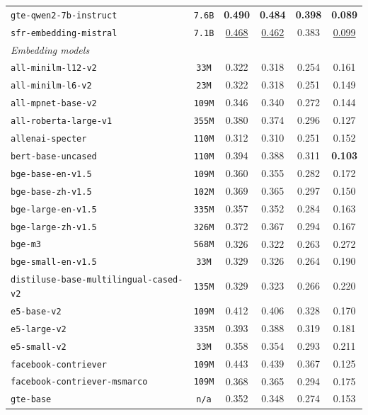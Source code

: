 \documentclass{article}
\begin{document}
\begin{table}[h!]
{\begin{tabular}{lccccc}
\texttt{gte-qwen2-7b-instruct} & \texttt{7.6B} & \textbf{0.490} & \textbf{0.484} & \textbf{0.398} & \textbf{0.089} \\
\texttt{sfr-embedding-mistral} & \texttt{7.1B} & \underline{0.468} & \underline{0.462} & 0.383 & \underline{0.099} \\
\midrule
\multicolumn{6}{l}{\textit{Embedding models}} \\
\midrule
\texttt{all-minilm-l12-v2} & \texttt{33M} & 0.322 & 0.318 & 0.254 & 0.161 \\
\texttt{all-minilm-l6-v2} & \texttt{23M} & 0.322 & 0.318 & 0.251 & 0.149 \\
\texttt{all-mpnet-base-v2} & \texttt{109M} & 0.346 & 0.340 & 0.272 & 0.144 \\
\texttt{all-roberta-large-v1} & \texttt{355M} & 0.380 & 0.374 & 0.296 & 0.127 \\
\texttt{allenai-specter} & \texttt{110M} & 0.312 & 0.310 & 0.251 & 0.152 \\
\texttt{bert-base-uncased} & \texttt{110M} & 0.394 & 0.388 & 0.311 & \textbf{0.103} \\
\texttt{bge-base-en-v1.5} & \texttt{109M} & 0.360 & 0.355 & 0.282 & 0.172 \\
\texttt{bge-base-zh-v1.5} & \texttt{102M} & 0.369 & 0.365 & 0.297 & 0.150 \\
\texttt{bge-large-en-v1.5} & \texttt{335M} & 0.357 & 0.352 & 0.284 & 0.163 \\
\texttt{bge-large-zh-v1.5} & \texttt{326M} & 0.372 & 0.367 & 0.294 & 0.167 \\
\texttt{bge-m3} & \texttt{568M} & 0.326 & 0.322 & 0.263 & 0.272 \\
\texttt{bge-small-en-v1.5} & \texttt{33M} & 0.329 & 0.326 & 0.264 & 0.190 \\
\texttt{distiluse-base-multilingual-cased-v2} & \texttt{135M} & 0.329 & 0.323 & 0.266 & 0.220 \\
\texttt{e5-base-v2} & \texttt{109M} & 0.412 & 0.406 & 0.328 & 0.170 \\
\texttt{e5-large-v2} & \texttt{335M} & 0.393 & 0.388 & 0.319 & 0.181 \\
\texttt{e5-small-v2} & \texttt{33M} & 0.358 & 0.354 & 0.293 & 0.211 \\
\texttt{facebook-contriever} & \texttt{109M} & 0.443 & 0.439 & 0.367 & 0.125 \\
\texttt{facebook-contriever-msmarco} & \texttt{109M} & 0.368 & 0.365 & 0.294 & 0.175 \\
\texttt{gte-base} & \texttt{n/a} & 0.352 & 0.348 & 0.274 & 0.153 \\

\end{tabular}}
\end{table}
\end{document}
